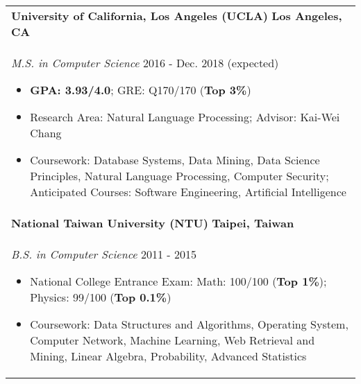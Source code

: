 \documentclass[letterpaper,11pt]{article} %
\begin{document}
{%
\begin{tabular}{p{18.5cm}}
{\bf{University of California, Los Angeles (UCLA)}}  \hfill \bf{Los Angeles, CA}\\
{\it M.S. in Computer Science} \hfill  2016 - Dec. 2018 (expected)
\begin{itemize}
\item \textbf{GPA: 3.93/4.0}; GRE: Q170/170 (\textbf{Top 3\%})
\item Research Area: Natural Language Processing; Advisor: Kai-Wei Chang 
\item Coursework: Database Systems, Data Mining, Data Science Principles, Natural Language Processing, Computer Security; Anticipated Courses: Software Engineering, Artificial Intelligence \vspace*{-\baselineskip}%
\end{itemize}\\ 
\vspace{.1mm}
%
{\bf{National Taiwan University (NTU)}} \hfill \bf{Taipei, Taiwan}\\
{\it B.S. in Computer Science} \hfill 2011 - 2015
\begin{itemize}
\item National College Entrance Exam:  Math: 100/100 (\textbf{Top 1\%}); Physics: 99/100 (\textbf{Top 0.1\%})
\item Coursework: Data Structures and Algorithms, Operating System, Computer Network, Machine Learning, Web Retrieval and Mining, Linear Algebra, Probability, Advanced Statistics \vspace*{-\baselineskip} 
\end{itemize} 
\end{tabular}

}
\end{document}
